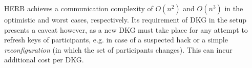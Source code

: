 

HERB achieves a communication complexity of $O(n^2)$ and $O(n^3)$ in the optimistic and worst cases, respectively. Its requirement of DKG in the setup presents a caveat however, as a new DKG must take place for any attempt to refresh keys of participants, e.g. in case of a suspected hack or a simple \textit{reconfiguration} (in which the set of participants changes). This can incur additional cost per DKG.
